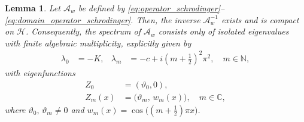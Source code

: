 \documentclass[letterpaper, 10 pt, conference]{ieeeconf}  %
\newtheorem{lemma}{Lemma}%
\begin{document}
\begin{lemma}
Let $\mathcal{A}_{w}$ be defined by \eqref{eq:operator_schrodinger}--\eqref{eq:domain_operator_schrodinger}. Then, the inverse $\mathcal{A}_{w}^{-1}$ exists and is compact on $\mathcal{H}$. Consequently, the spectrum of $\mathcal{A}_{w}$ consists only of isolated eigenvalues with finite algebraic multiplicity, explicitly given by 
\begin{align*} 
\lambda_{0} &= -K, & \lambda_{m} &= -c + i\left(m+\tfrac{1}{2}\right)^{2}\pi^{2}, \quad m\in\mathbb{N},
\end{align*}
    \noindent with eigenfunctions
\begin{align*}
    Z_0&=(\vartheta_0,0),\\
    Z_m(x)&=\big(\vartheta_m,\,w_m(x)\big),\quad m\in\mathbb{C},
\end{align*}
\noindent where $\vartheta_0,\,\vartheta_m\neq 0$ and $w_m(x)=\cos\!\big((m+\tfrac12)\pi x\big)$.
\end{lemma}

\medskip
\end{document}
